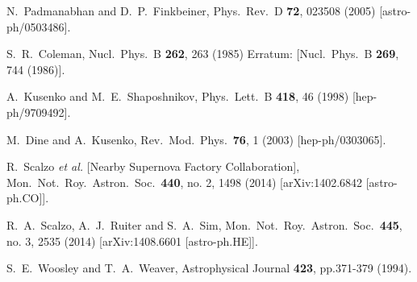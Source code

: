 \documentclass[twocolumn,preprintnumbers,amsmath,amssymb,prl, superscriptaddress]{revtex4}
\begin{document}
\begin{thebibliography}{99}
  N.~Padmanabhan and D.~P.~Finkbeiner,
  Phys.\ Rev.\ D {\bf 72}, 023508 (2005)
  [astro-ph/0503486].


  S.~R.~Coleman,
  Nucl.\ Phys.\ B {\bf 262}, 263 (1985)
  Erratum: [Nucl.\ Phys.\ B {\bf 269}, 744 (1986)].


  A.~Kusenko and M.~E.~Shaposhnikov,
  Phys.\ Lett.\ B {\bf 418}, 46 (1998)
  [hep-ph/9709492].


  M.~Dine and A.~Kusenko,
  Rev.\ Mod.\ Phys.\  {\bf 76}, 1 (2003)
  [hep-ph/0303065].


  R.~Scalzo {\it et al.} [Nearby Supernova Factory Collaboration],
  Mon.\ Not.\ Roy.\ Astron.\ Soc.\  {\bf 440}, no. 2, 1498 (2014)
  [arXiv:1402.6842 [astro-ph.CO]].


  R.~A.~Scalzo, A.~J.~Ruiter and S.~A.~Sim,
  Mon.\ Not.\ Roy.\ Astron.\ Soc.\  {\bf 445}, no. 3, 2535 (2014)
  [arXiv:1408.6601 [astro-ph.HE]].


  S.~E.~Woosley and T.~A.~Weaver, Astrophysical Journal {\bf 423}, pp.371-379 (1994).


\end{thebibliography}
\end{document}
